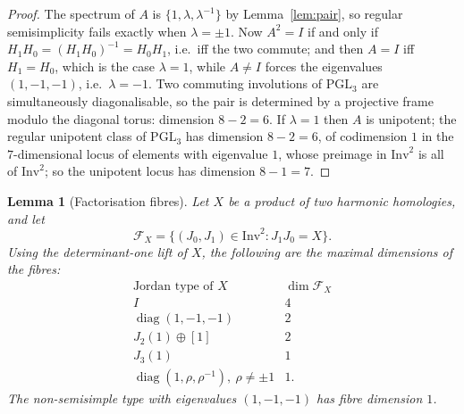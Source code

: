 \documentclass[11pt,a4paper]{article}
\theoremstyle{plain}
\newtheorem{lemma}[theorem]{Lemma}
\theoremstyle{definition}
\theoremstyle{remark}
\newcommand{\PGL}{\mathrm{PGL}}
\begin{document}
\begin{proof}
The spectrum of $A$ is $\{1,\lambda,\lambda^{-1}\}$ by Lemma~\ref{lem:pair}, so
regular semisimplicity fails exactly when $\lambda=\pm1$. Now $A^2=I$ if and only
if $H_1H_0=(H_1H_0)^{-1}=H_0H_1$, i.e.\ iff the two commute; and then $A=I$ iff
$H_1=H_0$, which is the case $\lambda=1$, while $A\neq I$ forces the eigenvalues
$(1,-1,-1)$, i.e.\ $\lambda=-1$. Two commuting involutions of $\PGL_3$
are simultaneously diagonalisable, so the pair is determined by a projective frame
modulo the diagonal torus: dimension $8-2=6$. If $\lambda=1$ then $A$ is unipotent;
the regular unipotent class of $\PGL_3$ has dimension $8-2=6$, of codimension $1$
in the $7$-dimensional locus of elements with eigenvalue $1$, whose preimage in
$\mathrm{Inv}^2$ is all of $\mathrm{Inv}^2$; so the unipotent locus has dimension
$8-1=7$.
\end{proof}

\begin{lemma}[Factorisation fibres]\label{lem:factorfibres}
Let $X$ be a product of two harmonic homologies, and let
\[
 \mathcal F_X=\{(J_0,J_1)\in\mathrm{Inv}^2:J_1J_0=X\}.
\]
Using the determinant-one lift of $X$, the following are the maximal dimensions of
the fibres:
\[
\begin{array}{c|c}
\text{Jordan type of }X&\dim\mathcal F_X\\ \hline
I&4\\
\operatorname{diag}(1,-1,-1)&2\\
J_2(1)\oplus[1]&2\\
J_3(1)&1\\
\operatorname{diag}(1,\rho,\rho^{-1}),\ \rho\neq\pm1&1.
\end{array}
\]
The non-semisimple type with eigenvalues $(1,-1,-1)$ has fibre dimension $1$.
\end{lemma}
\end{document}
